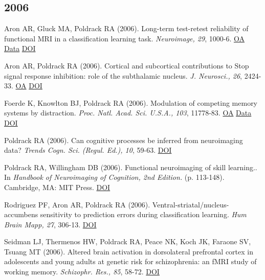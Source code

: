 \subsection*{2006}

Aron AR, Gluck MA, Poldrack RA (2006). Long-term test-retest reliability of functional MRI in a classification learning task. \textit{Neuroimage, 29}, 1000-6. \href{https://www.ncbi.nlm.nih.gov/pmc/articles/PMC1630684}{OA} \href{https://openneuro.org/datasets/ds000017/versions/00001}{Data} \href{http://dx.doi.org/10.1016/j.neuroimage.2005.08.010}{DOI} \vspace{2mm}

Aron AR, Poldrack RA (2006). Cortical and subcortical contributions to Stop signal response inhibition: role of the subthalamic nucleus. \textit{J. Neurosci., 26}, 2424-33. \href{https://www.ncbi.nlm.nih.gov/pmc/articles/PMC6793670}{OA} \href{http://dx.doi.org/10.1523/jneurosci.4682-05.2006}{DOI} \vspace{2mm}

Foerde K, Knowlton BJ, Poldrack RA (2006). Modulation of competing memory systems by distraction. \textit{Proc. Natl. Acad. Sci. U.S.A., 103}, 11778-83. \href{https://www.ncbi.nlm.nih.gov/pmc/articles/PMC1544246}{OA} \href{https://openneuro.org/datasets/ds000011/versions/00001}{Data} \href{http://dx.doi.org/10.1073/pnas.0602659103}{DOI} \vspace{2mm}

Poldrack RA (2006). Can cognitive processes be inferred from neuroimaging data? \textit{Trends Cogn. Sci. (Regul. Ed.), 10}, 59-63. \href{http://dx.doi.org/10.1016/j.tics.2005.12.004}{DOI} \vspace{2mm}

Poldrack RA, Willingham DB (2006). Functional neuroimaging of skill learning.. In \textit{Handbook of Neuroimaging of Cognition, 2nd Edition.} (p. 113-148). Cambridge, MA: MIT Press. \href{http://dx.doi.org/9780262033442}{DOI} \vspace{2mm}

Rodriguez PF, Aron AR, Poldrack RA (2006). Ventral-striatal/nucleus-accumbens sensitivity to prediction errors during classification learning. \textit{Hum Brain Mapp, 27}, 306-13. \href{http://dx.doi.org/10.1002/hbm.20186}{DOI} \vspace{2mm}

Seidman LJ, Thermenos HW, Poldrack RA, Peace NK, Koch JK, Faraone SV, Tsuang MT (2006). Altered brain activation in dorsolateral prefrontal cortex in adolescents and young adults at genetic risk for schizophrenia: an fMRI study of working memory. \textit{Schizophr. Res., 85}, 58-72. \href{http://dx.doi.org/10.1016/j.schres.2006.03.019}{DOI} \vspace{2mm}

